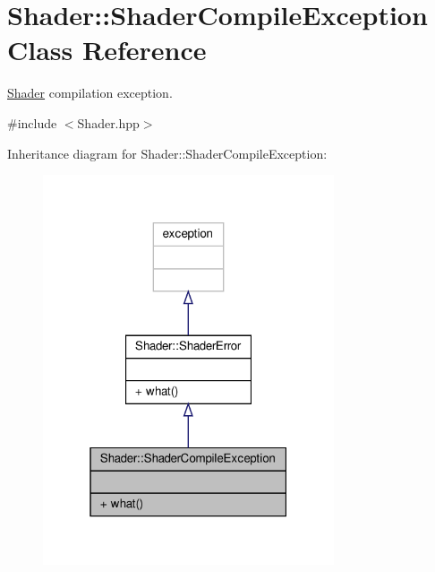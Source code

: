 \hypertarget{class_shader_1_1_shader_compile_exception}{}\section{Shader\+:\+:Shader\+Compile\+Exception Class Reference}
\label{class_shader_1_1_shader_compile_exception}


\hyperlink{class_shader}{Shader} compilation exception.  




{\ttfamily \#include $<$Shader.\+hpp$>$}



Inheritance diagram for Shader\+:\+:Shader\+Compile\+Exception\+:
\nopagebreak
\begin{figure}[H]
\begin{center}
\leavevmode
\includegraphics[width=244pt]{class_shader_1_1_shader_compile_exception__inherit__graph}
\end{center}
\end{figure}


